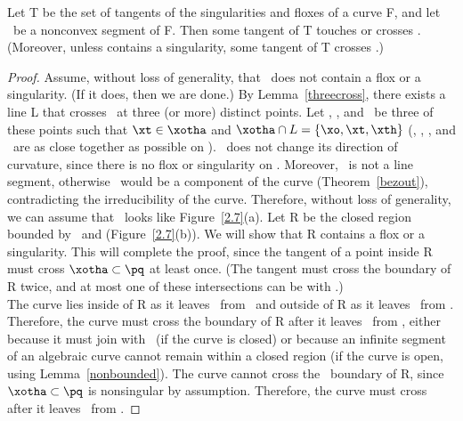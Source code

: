 \begin{theorem}
\label{tangents-split}
Let T be the set of tangents of the singularities and floxes of a curve F,
and let \ be a nonconvex segment of F.
Then some tangent of T touches or crosses .
(Moreover, unless  contains a singularity, some tangent of T
crosses .)
\end{theorem}
%
\begin{proof}
Assume, without loss of generality, that \pq\  does not contain a flox or 
a singularity.
(If it does, then we are done.)
By Lemma~\ref{threecross}, there exists a line L that crosses \pq\  at 
three (or more) distinct points.
Let \xo, \xt, and \xth\ be three of these points such that $\xt \in \xotha$ 
and \mbox{$\xotha \cap L = \{ \xo,\xt,\xth\}$} 
(\ie, \xo, \xt, and \xth\ are as close together as possible on \pq).
\xotha\ does not change its direction of curvature,
since there is no flox or singularity on \pq.
Moreover, \xotha\ is not a line segment, otherwise \lyne{\xo\xth}\ would be
a component of the curve (Theorem~\ref{bezout}),
contradicting the irreducibility of the curve.
Therefore, without loss of generality, we can assume 
that \xotha\ looks like Figure~\ref{2.7}(a).
Let R be the closed region bounded by \xotha\ 
and \seg{\xo\xth} (Figure~\ref{2.7}(b)).
We will show that R contains a flox or a 
singularity.
This will complete the proof, since the tangent
of a point inside R must cross $\xotha \subset \pq$ at least once.
(The tangent must cross the boundary of R twice, and at most one of these
intersections can be with 
%
%
\seg{\xo\xth}.)\\
%
\tab The curve lies inside of R as it leaves \xotha\ from \xo\ and outside 
of R as it leaves \xotha\ from \xth.
Therefore, the curve must cross the boundary of R after it leaves \xotha\
from \xo, either because it must join with \xth\ (if the curve is closed)
or because an infinite segment of an algebraic curve
cannot remain within a closed region (if the curve is open,
using Lemma~\ref{nonbounded}).
The curve cannot cross the \xotha\ boundary of R, since
\mbox{$\xotha \subset \pq$} is nonsingular by assumption.
Therefore, the curve must cross \seg{\xo\xth} after it leaves
\xotha\ from \xo.


\end{proof}
